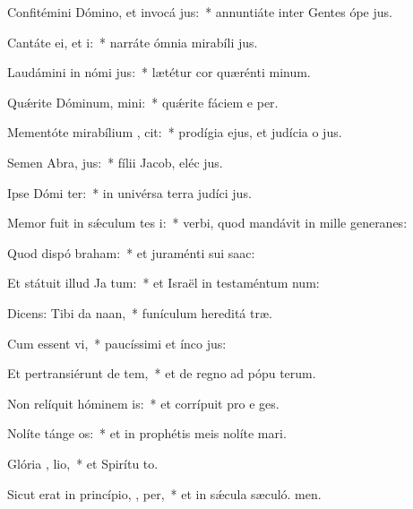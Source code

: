 \item Confitémini Dómino, et invocá  jus:~* annuntiáte inter Gentes ópe jus.
\item Cantáte ei, et  i:~* narráte ómnia mirabíli jus.
\item Laudámini in nómi  jus:~* lætétur cor quærénti minum.
\item Quǽrite Dóminum,  mini:~* quǽrite fáciem e per.
\item Mementóte mirabílium ,  cit:~* prodígia ejus, et judícia o jus.
\item Semen Abra,  jus:~* fílii Jacob, eléc jus.
\item Ipse Dómi  ter:~* in univérsa terra judíci jus.
\item Memor fuit in sǽculum tes i:~* verbi, quod mandávit in mille generanes:
\item Quod dispó  braham:~* et juraménti sui  saac:
\item Et státuit illud Ja  tum:~* et Israël in testaméntum num:
\item Dicens: Tibi da  naan,~* funículum hereditá træ.
\item Cum essent  vi,~* paucíssimi et ínco jus:
\item Et pertransiérunt de   tem,~* et de regno ad pópu terum.
\item Non relíquit hóminem  is:~* et corrípuit pro e ges.
\item Nolíte tánge  os:~* et in prophétis meis nolíte mari.
\item Glória ,  lio,~* et Spirítu to.
\item Sicut erat in princípio,  ,  per,~* et in sǽcula sæculó. men.
